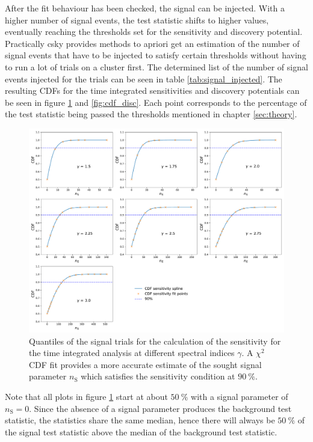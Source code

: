 After the fit behaviour has been checked, the signal can be injected.
With a higher number of signal events, the test statistic shifts to higher values, eventually reaching the thresholds set for the sensitivity and discovery potential.
Practically csky provides methods to apriori get an estimation of the number of signal events that have to be injected to satisfy certain thresholds without having to run a lot of trials on a cluster first.
The determined list of the number of signal events injected for the trials can be seen in table \ref{tab:signal_injected}.
The resulting CDFs for the time integrated sensitivities and discovery potentials can be seen in figure \ref{fig:cdf_sens} and \ref{fig:cdf_disc}.
Each point corresponds to the percentage of the test statistic being passed the thresholds mentioned in chapter \ref{sec:theory}.
\begin{figure}
    \centering
    \includegraphics[width=\linewidth]{Plots/05_csky/9_years_gfu_gold_cdf_sens.pdf}
    \caption{Quantiles of the signal trials for the calculation of the sensitivity for the time integrated analysis at different spectral indices $\gamma$. A $\chi^2$ CDF fit provides a more accurate estimate of the sought signal parameter $n_\text{S}$ which satisfies the sensitivity condition at $\SI{90}{\percent}$.}
    \label{fig:cdf_sens}
\end{figure}
Note that all plots in figure \ref{fig:cdf_sens} start at about $\SI{50}{\percent}$ with a signal parameter of $n_\text{S} = 0$.
Since the absence of a signal parameter produces the background test statistic, the statistics share the same median, hence there will always be $\SI{50}{\percent}$ of the signal test statistic above the median of the background test statistic.
